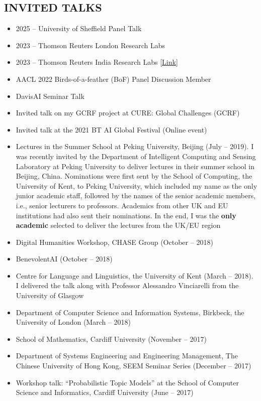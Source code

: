 \documentclass[margin]{res}
\begin{document}
\begin{resume}
\section{INVITED TALKS}
\begin{itemize}
\item 2025 -- University of Sheffield Panel Talk
\item 2023 -- Thomson Reuters London Research Labs
\item 2023 -- Thomson Reuters India Research Labs [\href{https://medium.com/tr-labs-ml-engineering-blog/a-talk-on-contextualized-attention-embeddings-by-professor-shoaib-jameel-5e68e3bb12f1}{Link}]
\item AACL 2022 Birds-of-a-feather (BoF) Panel Discussion Member
\item DavisAI Seminar Talk
\item Invited talk on my GCRF project at CURE: Global Challenges (GCRF)
\item Invited talk at the 2021 BT AI Global Festival (Online event)
\item Lectures in the Summer School at Peking University, Beijing (July -- 2019). I was recently invited by the Department of Intelligent Computing and Sensing Laboratory at Peking University to deliver lectures in their summer school in Beijing, China. Nominations were first sent by the School of Computing, the University of Kent, to Peking University, which included my name as the only junior academic staff, followed by the names of the senior academic members, i.e., senior lecturers to professors. Academics from other UK and EU institutions had also sent their nominations. In the end, I was the \textbf{only academic} selected to deliver the lectures from the UK/EU region
\item Digital Humanities Workshop, CHASE Group (October -- 2018)
\item BenevolentAI (October -- 2018)
\item Centre for Language and Linguistics, the University of Kent (March -- 2018). I delivered the talk along with Professor Alessandro Vinciarelli from the University of Glasgow
\item Department of Computer Science and Information Systems, Birkbeck, the University of London (March -- 2018)
\item School of Mathematics, Cardiff University (November -- 2017)
\item Department of Systems Engineering and Engineering Management, The Chinese University of Hong Kong, SEEM Seminar Series (December -- 2017)
\item Workshop talk: ``Probabilistic Topic Models'' at the School of Computer Science and Informatics, Cardiff University (June -- 2017)
\end{itemize}


\end{resume}
\end{document}
